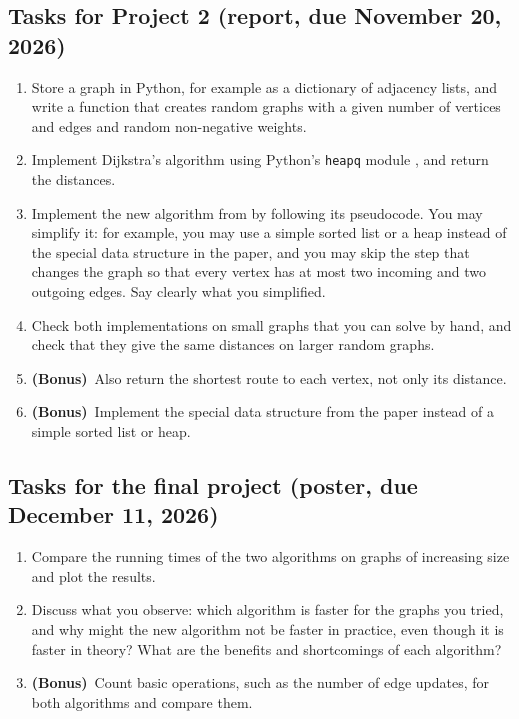 \documentclass[11pt,a4paper]{article}
\newcommand{\bonus}{\textbf{(Bonus)}}
\begin{document}
\subsection*{Tasks for Project 2 (report, due November 20, 2026)}
\begin{enumerate}
  \item Store a graph in Python, for example as a dictionary of adjacency
        lists, and write a function that creates random graphs with a given
        number of vertices and edges and random non-negative weights.
  \item Implement Dijkstra's algorithm using Python's \texttt{heapq} module
        \cite{heapq}, and return the distances.
  \item Implement the new algorithm from \cite{duan} by following its
        pseudocode. You may simplify it: for example, you may use a simple
        sorted list or a heap instead of the special data structure in the
        paper, and you may skip the step that changes the graph so that every
        vertex has at most two incoming and two outgoing edges. Say clearly
        what you simplified.
  \item Check both implementations on small graphs that you can solve by
        hand, and check that they give the same distances on larger random
        graphs.
  \item \bonus\ Also return the shortest route to each vertex, not only its
        distance.
  \item \bonus\ Implement the special data structure from the paper instead
        of a simple sorted list or heap.
\end{enumerate}

\subsection*{Tasks for the final project (poster, due December 11, 2026)}
\begin{enumerate}
  \item Compare the running times of the two algorithms on graphs of
        increasing size and plot the results.
  \item Discuss what you observe: which algorithm is faster for the graphs
        you tried, and why might the new algorithm not be faster in practice,
        even though it is faster in theory? What are the benefits and
        shortcomings of each algorithm?
  \item \bonus\ Count basic operations, such as the number of edge
        updates, for both algorithms and compare them.
\end{enumerate}
\end{document}
